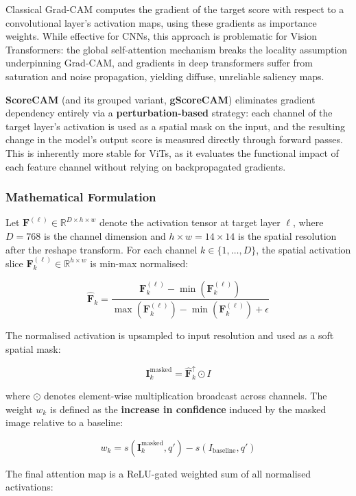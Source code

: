 Classical Grad-CAM computes the gradient of the target score with respect to a convolutional layer's activation maps, using these gradients as importance weights. While effective for CNNs, this approach is problematic for Vision Transformers: the global self-attention mechanism breaks the locality assumption underpinning Grad-CAM, and gradients in deep transformers suffer from saturation and noise propagation, yielding diffuse, unreliable saliency maps.

 \textbf{ScoreCAM} (and its grouped variant, \textbf{gScoreCAM}) eliminates gradient dependency entirely via a \textbf{perturbation-based} strategy: each channel of the target layer's activation is used as a spatial mask on the input, and the resulting change in the model's output score is measured directly through forward passes. This is inherently more stable for ViTs, as it evaluates the functional impact of each feature channel without relying on backpropagated gradients.

\subsubsection{Mathematical Formulation}

Let $\mathbf{F}^{(\ell)} \in \mathbb{R}^{D \times h \times w}$ denote the activation tensor at target layer $\ell$, where $D = 768$ is the channel dimension and $h \times w = 14 \times 14$ is the spatial resolution after the reshape transform. For each channel $k \in \{1, \ldots, D\}$, the spatial activation slice $\mathbf{F}_k^{(\ell)} \in \mathbb{R}^{h \times w}$ is min-max normalised:

\[
\hat{\mathbf{F}}_k = \frac{\mathbf{F}_k^{(\ell)} - \min(\mathbf{F}_k^{(\ell)})}{\max(\mathbf{F}_k^{(\ell)}) - \min(\mathbf{F}_k^{(\ell)}) + \epsilon}
\]

The normalised activation is upsampled to input resolution and used as a soft spatial mask:

\[
\mathbf{I}_k^{\text{masked}} = \hat{\mathbf{F}}_k^{\uparrow} \odot I
\]

where $\odot$ denotes element-wise multiplication broadcast across channels. The weight $w_k$ is defined as the \textbf{increase in confidence} induced by the masked image relative to a baseline:

\[
w_k = s\!\left(\mathbf{I}_k^{\text{masked}}, q'\right) - s\!\left(I_{\text{baseline}}, q'\right)
\]

The final attention map is a ReLU-gated weighted sum of all normalised activations:

